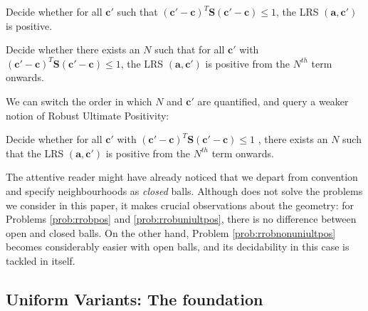 \begin{problem}
\label{prob:rrobpos}
Decide whether for all $\mathbf{c'}$ such that $(\mathbf{c'} - \mathbf{c})^T\mathbf{S}(\mathbf{c'} - \mathbf{c}) \le 1$, the LRS $(\mathbf{a}, \mathbf{c'})$ is positive.
\end{problem}

\begin{problem}
\label{prob:rrobuniultpos}
Decide whether there exists an $N$ such that for all $\mathbf{c'}$ with $(\mathbf{c'} - \mathbf{c})^T\mathbf{S}(\mathbf{c'} - \mathbf{c}) \le 1$, the LRS $(\mathbf{a}, \mathbf{c'})$ is positive from the $N^{th}$ term onwards.
\end{problem}

We can switch the order in which $N$ and $\mathbf{c'}$ are quantified, and query a weaker notion of Robust Ultimate Positivity:
\begin{problem}
\label{prob:rrobnonuniultpos}
Decide whether for all $\mathbf{c'}$ with $(\mathbf{c'} - \mathbf{c})^T\mathbf{S}(\mathbf{c'} - \mathbf{c}) \le 1$ , there exists an $N$ such that the LRS $(\mathbf{a}, \mathbf{c'})$ is positive from the $N^{th}$ term onwards.
\end{problem}

The attentive reader might have already noticed that we depart from convention and specify neighbourhoods as \textit{closed} balls. Although \cite{originalarxiv} does not solve the problems we consider in this paper, it makes crucial observations about the geometry: for Problems \ref{prob:rrobpos} and \ref{prob:rrobuniultpos}, there is no difference between open and closed balls. On the other hand, Problem \ref{prob:rrobnonuniultpos} becomes considerably easier with open balls, and its decidability in this case is tackled in \cite{originalarxiv} itself. 

\subsection{Uniform Variants: The foundation}

